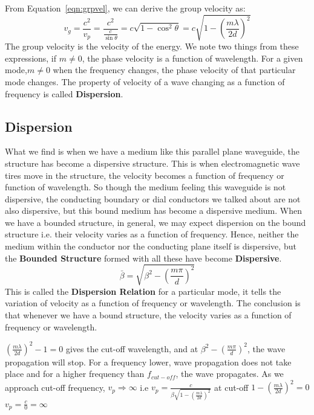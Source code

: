 From Equation~\ref{eqn:grpvel}, we can derive the group velocity as:
\begin{dmath}
v_g = \frac{c^2}{v_p} = \frac{c^2}{\frac{c}{\sin\theta}}= c\sqrt{1-\cos^{2}\theta} =c\sqrt{1-\left(\frac{m\lambda}{2d}\right)^{2}}
\label{eqn:grpvel2}
\end{dmath}
The group velocity is the velocity of the energy. We note two things from these expressions, if $m \neq 0$, the phase velocity is a function of wavelength. For a given mode,$m \neq 0$ when the frequency changes, the phase velocity of that particular mode changes. The property of velocity of a wave changing as a function of frequency is called \textbf{Dispersion}. 

\subsection{Dispersion}
What we find is when we have a medium like this parallel plane waveguide, the structure has become a dispersive structure. This is when electromagnetic wave tires move in the structure, the velocity becomes a function of frequency or function of wavelength. So though the medium feeling this waveguide is not dispersive, the conducting boundary or dial conductors we talked about are not also dispersive, but this bound medium has become a dispersive medium. When we have a bounded structure, in general, we may expect dispersion on the bound structure i.e. their velocity varies as a function of frequency. Hence, neither the medium within the conductor nor the conducting plane itself is dispersive, but the \textbf{Bounded Structure} formed with all these have become \textbf{Dispersive}.
\begin{equation}
\bar{\beta} = \sqrt{\beta^{2} -\left(\frac{m\pi}{d}\right)^{2}}
\end{equation} 
This is called the \textbf{Dispersion Relation} for a particular mode, it tells the variation of velocity as a function of frequency or wavelength. The conclusion is that whenever we have a bound structure, the velocity varies as a function of frequency or wavelength.

$(\frac{m\lambda}{2d})^{2} -1=0$ gives the cut-off wavelength, and at $\beta^{2} -(\frac{m\pi}{d})^{2}$, the wave propagation will stop. For a frequency lower, wave propagation does not take place and for a higher frequency than $f_{cut-off}$, the wave propagates. As we approach cut-off frequency, $v_{p}\Rightarrow \infty$ i.e $v_{p}= \frac{c}{\beta \sqrt{1- \left(\frac{m \lambda}{2d}\right)^{2}}}$ at cut-off $1 - (\frac{m\lambda}{2d})^{2}=0$ $v_{p} =\frac{c}{0} =\infty$

